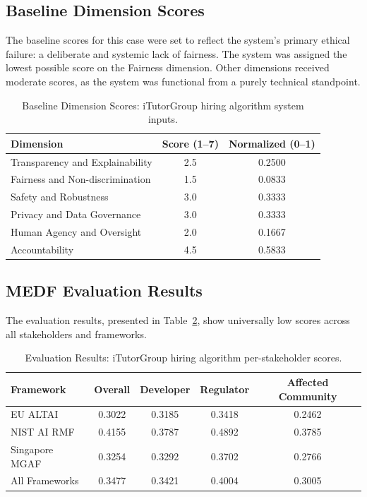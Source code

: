\subsection{Baseline Dimension Scores}

The baseline scores for this case were set to reflect the system's primary ethical failure: a deliberate and systemic lack of fairness. The system was assigned the lowest possible score on the Fairness dimension. Other dimensions received moderate scores, as the system was functional from a purely technical standpoint.

\begin{table}[H]
\centering
\caption{Baseline Dimension Scores: iTutorGroup hiring algorithm system inputs.}
\label{tab:cs2_baseline}
\begin{tabular}{@{}lcc@{}}
\toprule
\textbf{Dimension} & \textbf{Score (1--7)} & \textbf{Normalized (0--1)} \\
\midrule
Transparency and Explainability   & 2.5 & 0.2500 \\
Fairness and Non-discrimination   & 1.5 & 0.0833 \\
Safety and Robustness             & 3.0 & 0.3333 \\
Privacy and Data Governance       & 3.0 & 0.3333 \\
Human Agency and Oversight        & 2.0 & 0.1667 \\
Accountability                    & 4.5 & 0.5833 \\
\bottomrule
\end{tabular}
\end{table}

\subsection{MEDF Evaluation Results}

The evaluation results, presented in Table~\ref{tab:cs2_results}, show universally low scores across all stakeholders and frameworks.

\begin{table}[H]
\centering
\caption{Evaluation Results: iTutorGroup hiring algorithm per-stakeholder scores.}
\label{tab:cs2_results}
\begin{tabular}{@{}lcccc@{}}
\toprule
\textbf{Framework} & \textbf{Overall} & \textbf{Developer} & \textbf{Regulator} & \textbf{Affected Community} \\
\midrule
EU ALTAI        & 0.3022 & 0.3185 & 0.3418 & 0.2462 \\
NIST AI RMF     & 0.4155 & 0.3787 & 0.4892 & 0.3785 \\
Singapore MGAF  & 0.3254 & 0.3292 & 0.3702 & 0.2766 \\
\midrule
All Frameworks  & 0.3477 & 0.3421 & 0.4004 & 0.3005 \\
\bottomrule
\end{tabular}
\end{table}

